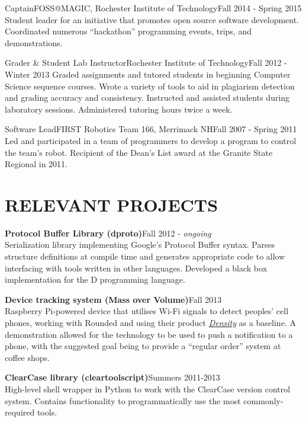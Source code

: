 \documentclass[line]{res}
\newcommand{\project}[2][]{{\bf #2}\hfill #1\\}
\def\ongoing{\textit{ongoing}}
\begin{document}
\begin{resume}
	\begin{job}{Captain}{FOSS@MAGIC, Rochester Institute of Technology}{Fall 2014 - Spring 2015}
		Student leader for an initiative that promotes open source software development.
		Coordinated numerous ``hackathon'' programming events, trips, and demonstrations.
	\end{job}

	\begin{job}{Grader \& Student Lab Instructor}{Rochester Institute of Technology}{Fall 2012 - Winter 2013}
		Graded assignments and tutored students in beginning Computer Science sequence courses.
		Wrote a variety of tools to aid in plagiarism detection and grading accuracy and consistency.
		Instructed and assisted students during laboratory sessions.
		Administered tutoring hours twice a week.
	\end{job}

	\begin{job}{Software Lead}{FIRST Robotics Team 166, Merrimack NH}{Fall 2007 - Spring 2011}
		Led and participated in a team of programmers to develop a program to control the team's robot.
		Recipient of the Dean's List award at the Granite State Regional in 2011.
	\end{job}

\section{RELEVANT PROJECTS}

	\project[Fall 2012 - \ongoing]   {Protocol Buffer Library (dproto)}
	Serialization library implementing Google's Protocol Buffer syntax.
	Parses structure definitions at compile time and generates appropriate code to allow interfacing with tools written in other languages.
	Developed a black box implementation for the D programming language.

	\project[Fall 2013]              {Device tracking system (Mass over Volume)}
	Raspberry Pi-powered device that utilises Wi-Fi signals to detect peoples' cell phones, working with Rounded and using their product \textit{\href{http://density.io}{Density}} as a baseline.
	A demonstration allowed for the technology to be used to push a notification to a phone, with the suggested goal being to provide a ``regular order'' system at coffee shops.

	\project[Summers 2011-2013]      {ClearCase library (cleartoolscript)}
	High-level shell wrapper in Python to work with the ClearCase version control system.
	Contains functionality to programmatically use the most commonly-required tools.


\end{resume}
\end{document}
